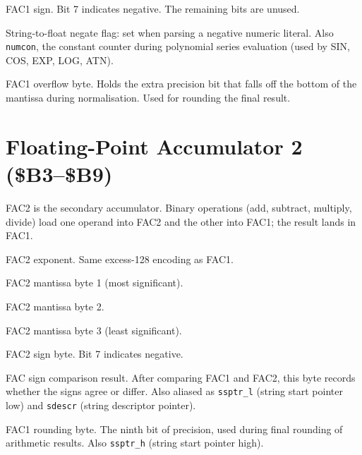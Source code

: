 
FAC1 sign.  Bit 7 indicates negative.  The remaining bits are unused.


String-to-float negate flag: set when parsing a negative numeric literal.
Also \texttt{numcon}, the constant counter during polynomial series evaluation
(used by SIN, COS, EXP, LOG, ATN).


FAC1 overflow byte.  Holds the extra precision bit that falls off the bottom
of the mantissa during normalisation.  Used for rounding the final result.

\section{Floating-Point Accumulator 2 (\$B3--\$B9)}

FAC2 is the secondary accumulator.  Binary operations (add, subtract, multiply,
divide) load one operand into FAC2 and the other into FAC1; the result lands
in FAC1.


FAC2 exponent.  Same excess-128 encoding as FAC1.


FAC2 mantissa byte 1 (most significant).


FAC2 mantissa byte 2.


FAC2 mantissa byte 3 (least significant).


FAC2 sign byte.  Bit 7 indicates negative.


FAC sign comparison result.  After comparing FAC1 and FAC2, this byte records
whether the signs agree or differ.  Also aliased as \texttt{ssptr\_l} (string
start pointer low) and \texttt{sdescr} (string descriptor pointer).


FAC1 rounding byte.  The ninth bit of precision, used during final rounding of
arithmetic results.  Also \texttt{ssptr\_h} (string start pointer high).

